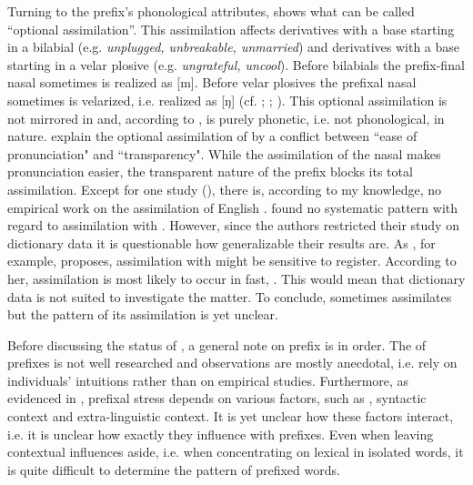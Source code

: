 Turning to the prefix's phonological attributes,  shows what can be called ``optional assimilation''. This assimilation affects derivatives with a base starting in a bilabial (e.g. \textit{unplugged, unbreakable, unmarried}) and derivatives with a base starting in a velar plosive (e.g. \textit{ungrateful, uncool}).
Before bilabials the prefix-final nasal sometimes is realized as [m]. Before velar plosives the prefixal nasal sometimes is velarized, i.e. realized as [ŋ] (cf. \citealt[5f.]{Hanote.2010}; \citealt[180]{Bauer.2013}; \citealt[125]{Okada.2013}). 
This optional assimilation is not mirrored in  and, according to \citet[125]{Okada.2013}, is purely phonetic, i.e. not phonological, in nature. \citet[87f.]{Stockwell.2001} explain the optional assimilation of  by a conflict between ``ease of pronunciation" and ``transparency". While the assimilation of the nasal makes pronunciation easier, the transparent nature of the prefix blocks its total assimilation.
Except for one study (\citealt{Hanote.2010}), there is, according to my knowledge, no empirical work on the assimilation of English . \cite{Hanote.2010} found no systematic pattern with regard to assimilation with . However, since the authors restricted their study on dictionary data it is questionable how generalizable their results are.  
As \citet[138]{Raffelsiefen.1999}, for example, proposes, assimilation with  might be sensitive to register.  According to her,  assimilation is most likely to occur in fast, . This would mean that dictionary data is not suited to investigate the matter.
To conclude,  sometimes assimilates but the pattern of its assimilation is yet unclear.




Before discussing the  status of , a general note on prefix  is in order. The  of prefixes is not well researched and observations are mostly anecdotal, i.e. rely on individuals' intuitions rather than on empirical studies. Furthermore, as evidenced in \cite{Videau.2015}, prefixal stress depends on various factors, such as , syntactic context and extra-linguistic context. It is yet unclear how these factors interact, i.e. it is unclear how exactly they influence  with prefixes.
Even when leaving contextual influences aside, i.e. when concentrating on lexical  in isolated words, it is quite difficult to determine the  pattern of prefixed words. 

